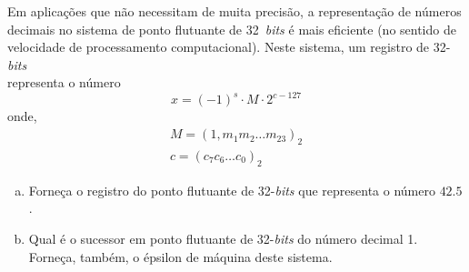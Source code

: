 \begin{exeresol}
  Em aplicações que não necessitam de muita precisão, a representação de números decimais no sistema de ponto flutuante de 32~{\it bits} é mais eficiente (no sentido de velocidade de processamento computacional). Neste sistema, um registro de 32-{\it bits}
  \begin{equation}
    [s ~ | ~ c_7 ~ c_6 ~ \ldots ~ c_0 ~ | ~ m_1 ~ m_2 ~ \ldots ~ m_{23}]
  \end{equation}
  representa o número
  \begin{equation}
    x = (-1)^s\cdot M\cdot 2^{c-127}
  \end{equation}
  onde,
  \begin{gather}
    M = (1,m_1m_2\ldots m_{23})_2\\
    c = (c_7c_6\ldots c_0)_2
  \end{gather}
  \begin{enumerate}[a)]
  \item Forneça o registro do ponto flutuante de 32-{\it bits} que representa o número $42.5$.
  \item Qual é o sucessor em ponto flutuante de 32-{\it bits} do número decimal 1. Forneça, também, o épsilon de máquina deste sistema.
  \end{enumerate}
\end{exeresol}
